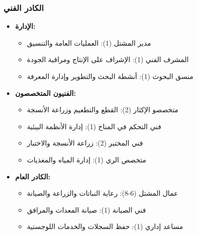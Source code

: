 \subsubsection{الكادر الفني}
\begin{itemize}
    \item \textbf{الإدارة:}
    \begin{itemize}
        \item مدير المشتل (1): العمليات العامة والتنسيق
        \item المشرف الفني (1): الإشراف على الإنتاج ومراقبة الجودة
        \item منسق البحوث (1): أنشطة البحث والتطوير وإدارة المعرفة
    \end{itemize}
    
    \item \textbf{الفنيون المتخصصون:}
    \begin{itemize}
        \item متخصصو الإكثار (2): القطع والتطعيم وزراعة الأنسجة
        \item فني التحكم في المناخ (1): إدارة الأنظمة البيئية
        \item فني المختبر (2): زراعة الأنسجة والاختبار
        \item متخصص الري (1): إدارة المياه والمغذيات
    \end{itemize}
    
    \item \textbf{الكادر العام:}
    \begin{itemize}
        \item عمال المشتل (6-8): رعاية النباتات والزراعة والصيانة
        \item فني الصيانة (1): صيانة المعدات والمرافق
        \item مساعد إداري (1): حفظ السجلات والخدمات اللوجستية
    \end{itemize}
\end{itemize}


